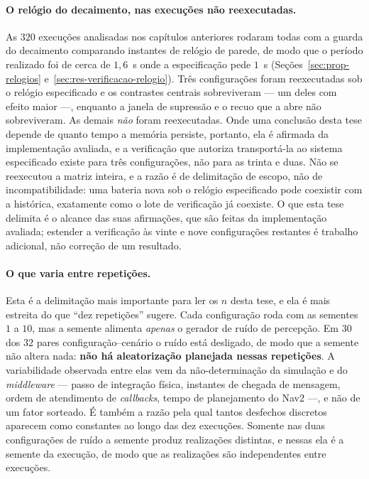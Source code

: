 \paragraph*{O relógio do decaimento, nas execuções não reexecutadas.} As $320$ execuções
analisadas nos capítulos anteriores rodaram todas com a guarda do decaimento comparando
instantes de relógio de parede, de modo que o período realizado foi de cerca de
$1{,}6$~s onde a especificação pede $1$~s
(Seções~\ref{sec:prop-relogios} e~\ref{sec:res-verificacao-relogio}). Três
configurações foram reexecutadas sob o relógio especificado e os contrastes centrais
sobreviveram --- um deles com efeito maior ---, enquanto a janela de supressão e o recuo
que a abre não sobreviveram. As demais \emph{não} foram reexecutadas. Onde uma conclusão
desta tese depende de quanto tempo a memória persiste, portanto, ela é afirmada da
implementação avaliada, e a verificação que autoriza transportá-la ao sistema
especificado existe para três configurações, não para as trinta e duas. Não se reexecutou
a matriz inteira, e a razão é de delimitação de escopo, não de incompatibilidade: uma
bateria nova sob o relógio especificado pode coexistir com a histórica, exatamente como
o lote de verificação já coexiste. O que esta tese delimita é o alcance das suas
afirmações, que são feitas da implementação avaliada; estender a verificação às vinte e
nove configurações restantes é trabalho adicional, não correção de um resultado.

\paragraph*{O que varia entre repetições.} Esta é a delimitação mais importante para
ler os $n$ desta tese, e ela é mais estreita do que ``dez repetições'' sugere. Cada
configuração roda com as sementes $1$ a $10$, mas a semente alimenta \emph{apenas} o
gerador de ruído de percepção. Em $30$ dos $32$ pares configuração--cenário o ruído
está desligado, de modo que a semente não altera nada: \textbf{não há aleatorização
planejada nessas repetições}. A variabilidade observada entre elas vem da
não-determinação da simulação e do \textit{middleware} --- passo de integração física,
instantes de chegada de mensagem, ordem de atendimento de \textit{callbacks}, tempo de
planejamento do Nav2 ---, e não de um fator sorteado. É também a razão pela qual
tantos desfechos discretos aparecem como constantes ao longo das dez execuções.
Somente nas duas configurações de ruído a semente produz realizações distintas, e
nessas ela é a semente da execução, de modo que as realizações são independentes entre
execuções.

